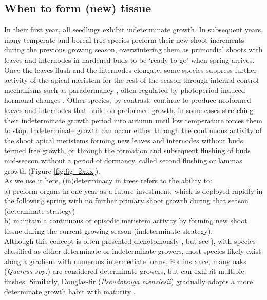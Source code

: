 \documentclass{article}
\begin{document}
	\subsection*{When to form (new) tissue}
	In their first year, all seedlings exhibit indeterminate growth. In subsequent years, many temperate and boreal tree species preform their new shoot increments during the previous growing season, overwintering them as primordial shoots with leaves and internodes in hardened buds to be `ready-to-go' when spring arrives. Once the leaves flush and the internodes elongate, some species suppress further activity of the apical meristem for the rest of the season through internal control mechanisms such as paradormancy \citep{langEndoParaEcodormancy1987}, often regulated by photoperiod-induced hormonal changes \citep{bohleniusCOFTRegulatory2006a}. Other species, by contrast, continue to produce neoformed leaves and internodes that build on preformed growth, in some cases stretching their indeterminate growth period into autumn until low temperature forces them to stop. Indeterminate growth can occur either through the continuous activity of the shoot apical meristems forming new leaves and internodes without buds, termed free growth, or through the formation and subsequent flushing of buds mid-season without a period of dormancy, called second flushing or lammas growth (Figure \ref{fig:fig_2xxx}). \\
	As we use it here, (in)determinacy in trees refers to the ability to:\\
	a) preform organs in one year as a future investment, which is deployed rapidly in the following spring with no further primary shoot growth during that season (determinate strategy)\\
	b) maintain a continuous or episodic meristem activity by forming new shoot tissue during the current growing season (indeterminate strategy).\\

Although this concept is often presented dichotomously \citep{kozlowskiGrowthControlWoody1997, lechowiczWhyTemperateDeciduous1984a}, but see \citealp{kikuzawaLeafSurvivalWoody1983, damascosBudCompositionBranching2005}), with species classified as either determinate or indeterminate growers, most species likely exist along a gradient with numerous intermediate forms. For instance, many oaks (\textit{Quercus spp.}) are considered determinate growers, but can exhibit multiple flushes. Similarly, Douglas-fir (\textit{Pseudotsuga menziesii}) gradually adopts a more determinate growth habit with maturity \citep{borchertConceptJuvenilityWoody1976, heuretOntogeneticTrendsMorphological2006}.\\
\end{document}
